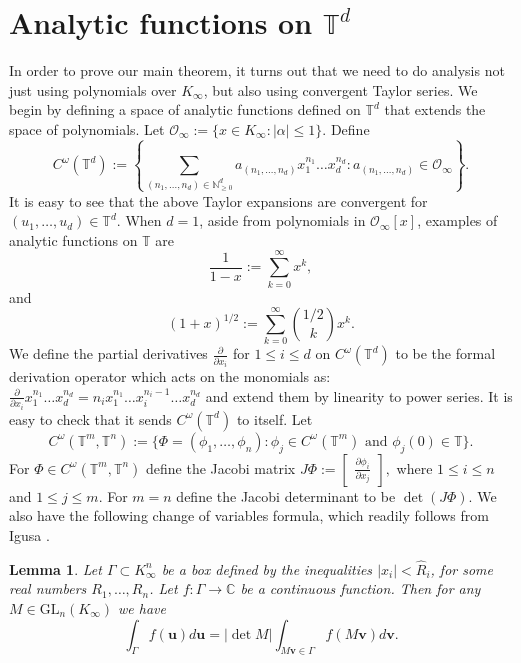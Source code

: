 \documentclass[11pt]{amsart}
\theoremstyle{plain}
\theoremstyle{plain}
\newtheorem{lemma}[theorem]{Lemma}
\renewcommand{\vec}[1]{\mathbf{#1}}
\theoremstyle{remark}
\theoremstyle{definition}
\renewcommand{\hat}{\widehat}
\newcommand{\Ki}{K_\infty}
\newcommand{\NNz}{\mathbb{N}_{\geq 0}}
\newcommand{\CC}{\mathbb{C}}
\newcommand{\TT}{\mathbb{T}}
\newcommand{\cO}{\mathcal{O}}
\begin{document}
\section{Analytic functions on $\TT^d$}
In order to prove our main theorem, it turns out that we need to do analysis not just using polynomials over $\Ki$, but also using  convergent Taylor series. We begin by defining a space of analytic functions defined on $\TT^d$  that extends the space of polynomials. Let  $\cO_{\infty}:=\{x\in K_{\infty}: |\alpha|\leq 1  \}.$ Define
 \[C^{\omega}(\TT^d):=\left\{\sum_{(n_1,\dots,n_d)\in \NNz^d}a_{(n_1,\dots,n_d)} x_1^{n_1}\dots x_d^{n_d}: a_{(n_1,\dots,n_d)} \in \cO_{\infty} \right\}. \]
It is easy to see that the above Taylor expansions are convergent for $(u_1,\dots,u_d)\in \TT^d.$ 
 When $d=1$, aside from polynomials in $\cO_{\infty}[x]$, examples of analytic functions on $\TT$ are
\[\frac{1}{1-x}:=\sum_{k=0}^{\infty}x^k,\]
and
\[(1+x)^{1/2}:=\sum_{k=0}^{\infty}\binom{1/2}{k}x^k.\]
We define the partial derivatives $\frac{\partial}{\partial x_i}$ for $1 \leq i\leq d$ on $C^{\omega}(\TT^d)$ to be the formal derivation  operator which acts on the monomials as:  $\frac{\partial}{\partial x_i} x_1^{n_1}\dots x_d^{n_d}=n_i  x_1^{n_1}\dots x_i^{n_i-1}\dots x_d^{n_d}$ and extend them by linearity to power series. It is easy to check that it sends $C^{\omega}(\TT^d)$  to itself. Let  
\[
C^{\omega}(\TT^m,\TT^n):= \{\Phi=(\phi_1,\dots,\phi_n): \phi_j\in C^{\omega}(\TT^m) \text{ and }\phi_j(0)\in\TT  \}.
\] 
For $\Phi \in C^{\omega}(\TT^m,\TT^n)$ define the Jacobi matrix 
\(
J\Phi:=\begin{bmatrix}   
\frac{\partial \phi_i}{\partial x_j} 
\end{bmatrix},
\)
 where $1\leq i\leq n$  and $1\leq j\leq m.$ For $m=n$ define the Jacobi determinant to be $\det (J\Phi). $ We also have the following change of variables formula, which readily follows from Igusa \cite[Lemma 7.4.2]{igusa}.

\begin{lemma}\label{lem:change}
Let $\Gamma\subset \Ki^n$ be a box defined by the inequalities 
$|x_i|<\hat R_i$, for some real numbers $R_1,\dots,R_n$.
Let $f:\Gamma\rightarrow \CC$ be a continuous function. Then 
for any $M\in \mathrm{GL}_n(\Ki)$ we have 
$$
\int_{\Gamma}f(\vec{u})d\vec{u}=|\det M| \int_{M\vec{v}\in \Gamma} f(M\vec{v}) d\vec{v}.
$$
\end{lemma}
\end{document}
